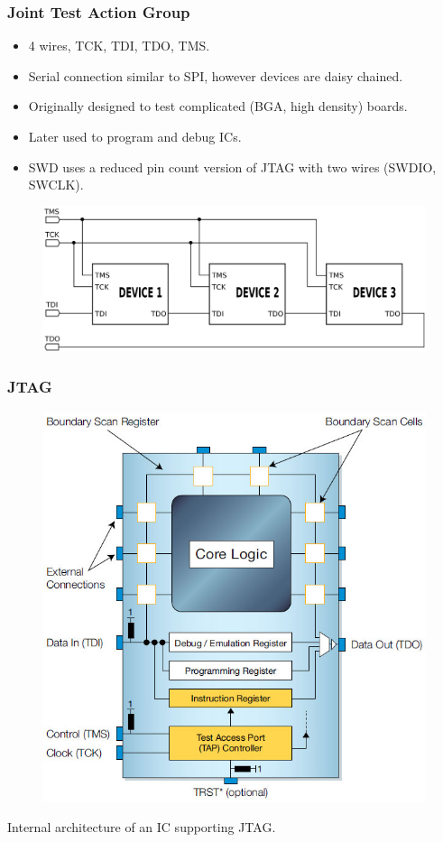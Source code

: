 \documentclass[t]{beamer}
\begin{document}

\begin{frame}[t]
\frametitle{Joint Test Action Group}
\begin{itemize}
	\item 4 wires, TCK, TDI, TDO, TMS.
	\item Serial connection similar to SPI, however devices are daisy chained. 
	\item Originally designed to test complicated (BGA, high density) boards.
	\item Later used to program and debug ICs.
	\item SWD uses a reduced pin count version of JTAG with two wires (SWDIO, SWCLK). 
\end{itemize}
\begin{figure}
	\includegraphics[width=0.7\linewidth]{jtagChain.png}
\end{figure}

\end{frame}


\begin{frame}[t]
\frametitle{JTAG}
\begin{figure}
	\includegraphics[width=0.5\linewidth]{jtagInternals.jpg}
\end{figure}
Internal architecture of an IC supporting JTAG.
\end{frame}
\end{document}
